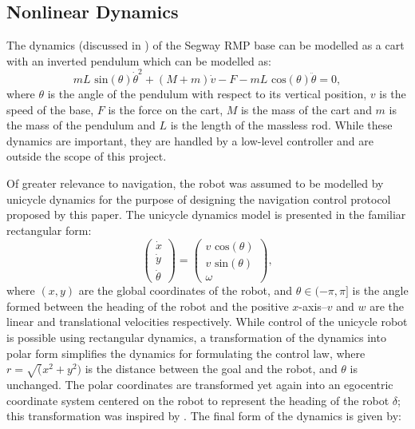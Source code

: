 \documentclass[journal]{IEEEtran}
\begin{document}
\subsection{Nonlinear Dynamics}
The dynamics (discussed in \cite{castro2012modeling}) of the Segway RMP base can be modelled as a cart with an inverted pendulum which can be modelled as:
\begin{equation}
 mL\text{ sin}(\theta)\dot{\theta}^2 + (M+m)\dot{v} - F - mL\text{ cos}(\theta)\ddot{\theta} = 0, 
\end{equation}
where $\theta$ is the angle of the pendulum with respect to its vertical position, $v$ is the speed of the base, $F$ is the force on the cart, $M$ is the mass of the cart and $m$ is the mass of the pendulum and $L$ is the length of the massless rod. While these dynamics are important, they are handled by a low-level controller and are outside the scope of this project. 

Of greater relevance to navigation, the robot was assumed to be modelled by unicycle dynamics for the purpose of designing the navigation control protocol proposed by this paper. The unicycle dynamics model is presented in the familiar rectangular form:
\begin{equation}
\left(
\begin{matrix}
\dot{x}\\
\dot{y}\\
\dot{\theta}
\end{matrix}
\right)
=
\left(
\begin{matrix}
v \text{ cos}(\theta)\\
v \text{ sin}(\theta)\\
\omega
\end{matrix}
\right),
\end{equation}
where $(x,y)$ are the global coordinates of the robot, and $\theta \in (-\pi ,\pi]$ is the angle formed between the heading of the robot and the positive $x$-axis--$v$ and $w$ are the linear and translational velocities respectively. While control of the unicycle robot is possible using rectangular dynamics, a transformation of the dynamics into polar form simplifies the dynamics for formulating the control law, where $r=\sqrt(x^2+y^2)$ is the distance between the goal and the robot, and $\theta$ is unchanged. The polar coordinates are transformed yet again into an egocentric coordinate system centered on the robot to represent the heading of the robot $\delta$; this transformation was inspired by \cite{park2011}. The final form of the dynamics is given by:  
\end{document}
